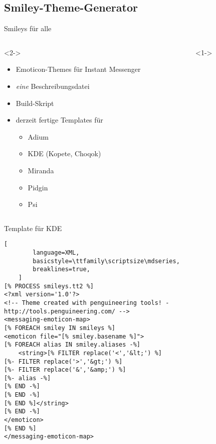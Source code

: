 \documentclass{beamer}
\begin{document}
\subsection{Smiley-Theme-Generator}

\begin{frame}{Smileys für alle}
    \begin{columns}
        \begin{column}{0.4\textwidth}<2->
            \begin{itemize}
                \item Emoticon-Themes für Instant Messenger
                \item \emph{eine} Beschreibungsdatei
                \item Build-Skript
                \item derzeit fertige Templates für
                    \begin{itemize}
                        \item Adium
                        \item KDE (Kopete, Choqok)
                        \item Miranda
                        \item Pidgin
                        \item Psi
                    \end{itemize}
            \end{itemize}
        \end{column}
        \begin{column}{0.6\textwidth}<1->
            \begin{centering}
            \end{centering}
        \end{column}
    \end{columns}
\end{frame}

\begin{frame}[fragile]{Template für KDE}
    \begin{lstlisting}[
        language=XML,
        basicstyle=\ttfamily\scriptsize\mdseries,
        breaklines=true,
    ]
[% PROCESS smileys.tt2 %]
<?xml version='1.0'?>
<!-- Theme created with penguineering tools! - http://tools.penguineering.com/ -->
<messaging-emoticon-map>
[% FOREACH smiley IN smileys %]
<emoticon file="[% smiley.basename %]">
[% FOREACH alias IN smiley.aliases -%]
    <string>[% FILTER replace('<','&lt;') %]
[%- FILTER replace('>','&gt;') %]
[%- FILTER replace('&','&amp;') %]
[%- alias -%]
[% END -%]
[% END -%]
[% END %]</string>
[% END -%]
</emoticon>
[% END %]
</messaging-emoticon-map>
    \end{lstlisting}
\end{frame}
\end{document}
